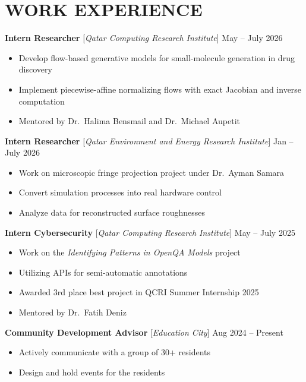 \documentclass[11pt,a4paper]{article}
\begin{document}
\section*{WORK EXPERIENCE}

\textbf{Intern Researcher} [\textit{Qatar Computing Research Institute}] \hfill May -- July 2026
\begin{itemize}[leftmargin=2em, nosep, label={}]
    \item Develop flow-based generative models for small-molecule generation in drug discovery
    \item Implement piecewise-affine normalizing flows with exact Jacobian and inverse computation
    \item Mentored by Dr.\ Halima Bensmail and Dr.\ Michael Aupetit
\end{itemize}

\vspace{2pt}

\textbf{Intern Researcher} [\textit{Qatar Environment and Energy Research Institute}] \hfill Jan -- July 2026
\begin{itemize}[leftmargin=2em, nosep, label={}]
    \item Work on microscopic fringe projection project under Dr.\ Ayman Samara
    \item Convert simulation processes into real hardware control
    \item Analyze data for reconstructed surface roughnesses
\end{itemize}

\vspace{2pt}

\textbf{Intern Cybersecurity} [\textit{Qatar Computing Research Institute}] \hfill May -- July 2025
\begin{itemize}[leftmargin=2em, nosep, label={}]
    \item Work on the \textit{Identifying Patterns in OpenQA Models} project
    \item Utilizing APIs for semi-automatic annotations
    \item Awarded 3rd place best project in QCRI Summer Internship 2025
    \item Mentored by Dr.\ Fatih Deniz
\end{itemize}

\vspace{2pt}

\textbf{Community Development Advisor} [\textit{Education City}] \hfill Aug 2024 -- Present
\begin{itemize}[leftmargin=2em, nosep, label={}]
    \item Actively communicate with a group of 30+ residents
    \item Design and hold events for the residents
\end{itemize}
\end{document}
